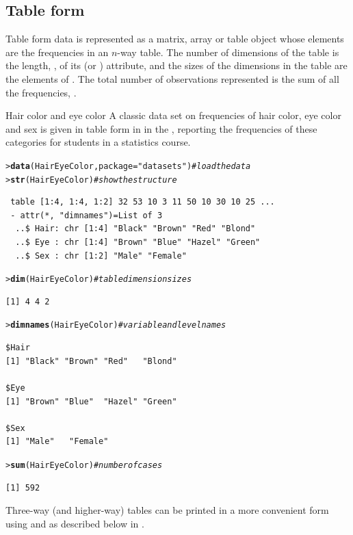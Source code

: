 \documentclass[10pt,krantz2]{krantz}\usepackage[]{graphicx}\usepackage[]{color}
\makeatletter
\newcommand{\hlstr}[1]{\textcolor[rgb]{0.192,0.494,0.8}{#1}}%
\newcommand{\hlcom}[1]{\textcolor[rgb]{0.678,0.584,0.686}{\textit{#1}}}%
\newcommand{\hlstd}[1]{\textcolor[rgb]{0.345,0.345,0.345}{#1}}%
\newcommand{\hlkwc}[1]{\textcolor[rgb]{0.333,0.667,0.333}{#1}}%
\newcommand{\hlkwd}[1]{\textcolor[rgb]{0.737,0.353,0.396}{\textbf{#1}}}%
\newenvironment{kframe}{%
 \def\at@end@of@kframe{}%
 \ifinner\ifhmode%
  \def\at@end@of@kframe{\end{minipage}}%
  \begin{minipage}{\columnwidth}%
 \fi\fi%
 \def\FrameCommand##1{\hskip\@totalleftmargin \hskip-\fboxsep
 \colorbox{shadecolor}{##1}\hskip-\fboxsep
     \hskip-\linewidth \hskip-\@totalleftmargin \hskip\columnwidth}%
 \MakeFramed {\advance\hsize-\width
   \@totalleftmargin\z@ \linewidth\hsize
   \@setminipage}}%
 {\par\unskip\endMakeFramed%
 \at@end@of@kframe}
\newenvironment{knitrout}{}{} %
\renewenvironment{knitrout}{\small\renewcommand{\baselinestretch}{.85}}{} %
\makeatother
\begin{document}
\subsection{Table form}
Table form data is represented as a matrix, array or table object
whose elements are the frequencies in an $n$-way table.
The number of dimensions of the table is the length,
, of its
 (or ) attribute, and the sizes of the
dimensions in the table are the elements of .
The total number of observations represented is the sum of
all the frequencies, .

\begin{Example}[ch2-hec]{Hair color and eye color}
A classic data set on frequencies of hair color, eye color and
sex is given in table form in  in the
, reporting the frequencies of these
categories for  students in
a statistics course.
\begin{knitrout}
\color{fgcolor}\begin{kframe}
\begin{alltt}
\hlstd{> }\hlkwd{data}\hlstd{(HairEyeColor,} \hlkwc{package} \hlstd{=} \hlstr{"datasets"}\hlstd{)}    \hlcom{# load the data}
\hlstd{> }\hlkwd{str}\hlstd{(HairEyeColor)}                \hlcom{# show the structure}
\end{alltt}
\begin{verbatim}
 table [1:4, 1:4, 1:2] 32 53 10 3 11 50 10 30 10 25 ...
 - attr(*, "dimnames")=List of 3
  ..$ Hair: chr [1:4] "Black" "Brown" "Red" "Blond"
  ..$ Eye : chr [1:4] "Brown" "Blue" "Hazel" "Green"
  ..$ Sex : chr [1:2] "Male" "Female"
\end{verbatim}
\begin{alltt}
\hlstd{> }\hlkwd{dim}\hlstd{(HairEyeColor)}                \hlcom{# table dimension sizes}
\end{alltt}
\begin{verbatim}
[1] 4 4 2
\end{verbatim}
\begin{alltt}
\hlstd{> }\hlkwd{dimnames}\hlstd{(HairEyeColor)}           \hlcom{# variable and level names}
\end{alltt}
\begin{verbatim}
$Hair
[1] "Black" "Brown" "Red"   "Blond"

$Eye
[1] "Brown" "Blue"  "Hazel" "Green"

$Sex
[1] "Male"   "Female"
\end{verbatim}
\begin{alltt}
\hlstd{> }\hlkwd{sum}\hlstd{(HairEyeColor)}                \hlcom{# number of cases}
\end{alltt}
\begin{verbatim}
[1] 592
\end{verbatim}
\end{kframe}
\end{knitrout}
Three-way (and higher-way) tables can be printed in a more convenient
form using  and  as described below
in .
\end{Example}
\end{document}
